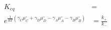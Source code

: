 \begin{eqnarray}
 K_{eq} & = \\
e^{\frac{1}{RT}\left(\gamma_C\mu_C^\circ+ \gamma_D\mu_D^\circ -\gamma_A\mu_A^\circ-\gamma_B\mu_B^\circ\right)}&  = \frac{k_+}{k_-} \\
\end{eqnarray}